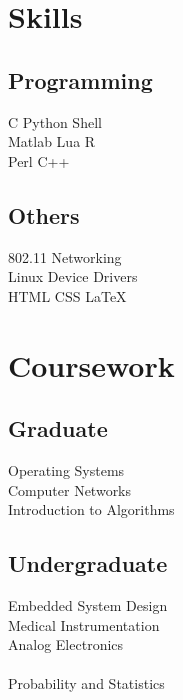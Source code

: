 \documentclass[letterpaper]{deedy-resume} %
\begin{document}
\noindent\makebox[\linewidth]{\color{headings}\rule{\linewidth}{0.4pt}} %
\begin{minipage}[t]{0.25\textwidth} %
\section{Skills}
\subsection{Programming}
C \textbullet{} Python \textbullet{} Shell \\
Matlab \textbullet{} Lua \textbullet{} R \\
Perl \textbullet{} C++
\vspace{\topsep}
\subsection{Others}
802.11 \textbullet{} Networking \textbullet{} \\
Linux Device Drivers \textbullet{} \\
HTML \textbullet{} CSS \textbullet{} \LaTeX
\lsectionspace %
\section{Coursework}
\subsection{Graduate}
\textbullet{} Operating Systems \\
\textbullet{} Computer Networks \\
\textbullet{} Introduction to Algorithms \\
\subsection{Undergraduate}
\textbullet{} Embedded System Design \\
\textbullet{} Medical Instrumentation \\
\textbullet{} Analog Electronics \\
 \\
\textbullet{} Probability and Statistics \\

\end{minipage}
\end{document}
